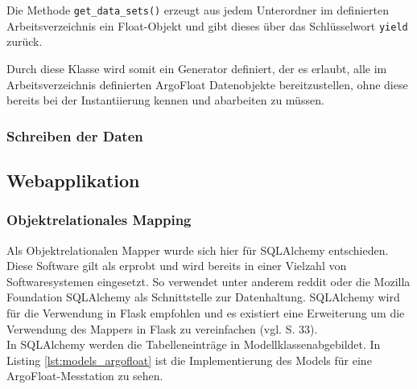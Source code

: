 Die Methode \texttt{get\_data\_sets()} erzeugt aus jedem Unterordner im definierten Arbeitsverzeichnis ein Float-Objekt und gibt dieses über das Schlüsselwort \texttt{yield} zurück. 

Durch diese Klasse wird somit ein Generator definiert, der es erlaubt, alle im Arbeitsverzeichnis definierten ArgoFloat Datenobjekte bereitzustellen, ohne diese bereits bei der Instantiierung kennen und abarbeiten zu müssen.



    
\subsubsection{Schreiben der Daten}
    


\subsection{Webapplikation}

\subsubsection{Objektrelationales Mapping}\label{sec:implementierungORM}


Als Objektrelationalen Mapper wurde sich hier für SQLAlchemy entschieden. Diese Software gilt als erprobt und wird bereits in einer Vielzahl von Softwaresystemen eingesetzt. So verwendet unter anderem reddit oder die Mozilla Foundation SQLAlchemy als Schnittstelle zur Datenhaltung. SQLAlchemy wird für die Verwendung in Flask empfohlen und es existiert eine Erweiterung um die Verwendung des Mappers in Flask zu vereinfachen (vgl. \cite{openingtheflask} S. 33). \\


In SQLAlchemy werden die Tabelleneinträge in Modellklassenabgebildet. In Listing \ref{lst:models_argofloat} ist die Implementierung des Models für eine ArgoFloat-Messtation zu sehen.

